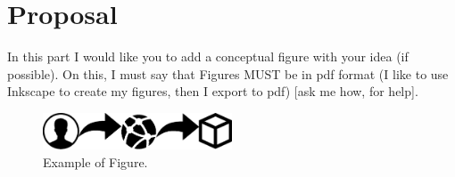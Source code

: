 \section{Proposal}

In this part I would like you to add a conceptual figure with your idea (if possible). On this, I must say that Figures MUST be in pdf format (I like to use Inkscape to create my figures, then I export to pdf) [ask me how, for help]. 

\begin{figure}[h!]
	\label{fig:approach}
	\centering
	\includegraphics[width=0.5\textwidth]{figs/example.eps}
	\caption{Example of Figure.}
\end{figure}


